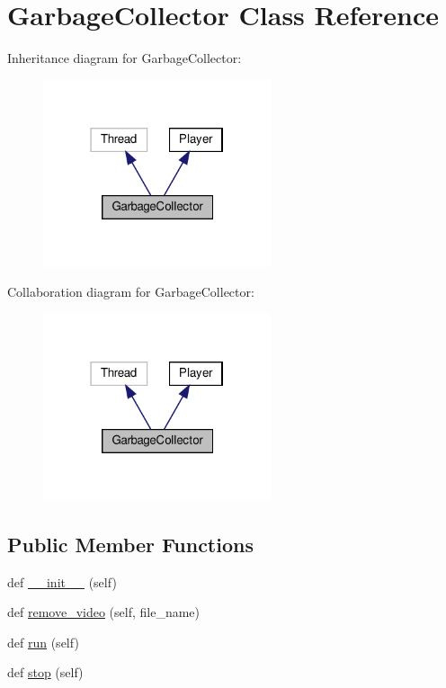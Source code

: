 \hypertarget{class_client_1_1_garbage_collector}{}\section{Garbage\+Collector Class Reference}
\label{class_client_1_1_garbage_collector}


Inheritance diagram for Garbage\+Collector\+:
\nopagebreak
\begin{figure}[H]
\begin{center}
\leavevmode
\includegraphics[width=190pt]{class_client_1_1_garbage_collector__inherit__graph}
\end{center}
\end{figure}


Collaboration diagram for Garbage\+Collector\+:
\nopagebreak
\begin{figure}[H]
\begin{center}
\leavevmode
\includegraphics[width=190pt]{class_client_1_1_garbage_collector__coll__graph}
\end{center}
\end{figure}
\subsection*{Public Member Functions}
\begin{DoxyCompactItemize}
\item 
def \hyperlink{class_client_1_1_garbage_collector_ae64f0875afe3067b97ba370b354b9213}{\+\_\+\+\_\+init\+\_\+\+\_\+} (self)
\item 
def \hyperlink{class_client_1_1_garbage_collector_af2fd45ce96ebc291f2cf6cb427fb00f0}{remove\+\_\+video} (self, file\+\_\+name)
\item 
def \hyperlink{class_client_1_1_garbage_collector_ad22709b2e67308af35f55680d5a026e0}{run} (self)
\item 
def \hyperlink{class_client_1_1_garbage_collector_a26ca7c1c7fcdd35378e7be97727047a6}{stop} (self)
\end{DoxyCompactItemize}
